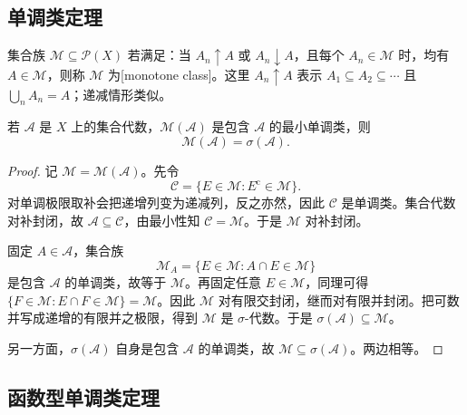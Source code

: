 \subsection{单调类定理}
\label{b1:subsec:010304}

\begin{definition}
\label{b1:def:monotone-class}
集合族 \(\mathcal M\subseteq\mathcal P(X)\) 若满足：当 \(A_n\uparrow A\) 或 \(A_n\downarrow A\)，且每个 \(A_n\in\mathcal M\) 时，均有 \(A\in\mathcal M\)，则称 \(\mathcal M\) 为[monotone class]。这里 \(A_n\uparrow A\) 表示 \(A_1\subseteq A_2\subseteq\cdots\) 且 \(\bigcup_nA_n=A\)；递减情形类似。
\end{definition}

\begin{theorem}
\label{b1:thm:monotone-class}
若 \(\mathcal A\) 是 \(X\) 上的集合代数，\(\mathcal M(\mathcal A)\) 是包含 \(\mathcal A\) 的最小单调类，则
\[
\mathcal M(\mathcal A)=\sigma(\mathcal A).
\]
\end{theorem}
\begin{proof}
记 \(\mathcal M=\mathcal M(\mathcal A)\)。先令
\[
\mathcal C=\{E\in\mathcal M:E^{\mathrm c}\in\mathcal M\}.
\]
对单调极限取补会把递增列变为递减列，反之亦然，因此 \(\mathcal C\) 是单调类。集合代数对补封闭，故 \(\mathcal A\subseteq\mathcal C\)，由最小性知 \(\mathcal C=\mathcal M\)。于是 \(\mathcal M\) 对补封闭。

固定 \(A\in\mathcal A\)，集合族
\[
\mathcal M_A=\{E\in\mathcal M:A\cap E\in\mathcal M\}
\]
是包含 \(\mathcal A\) 的单调类，故等于 \(\mathcal M\)。再固定任意 \(E\in\mathcal M\)，同理可得 \(\{F\in\mathcal M:E\cap F\in\mathcal M\}=\mathcal M\)。因此 \(\mathcal M\) 对有限交封闭，继而对有限并封闭。把可数并写成递增的有限并之极限，得到 \(\mathcal M\) 是 \(\sigma\)-代数。于是 \(\sigma(\mathcal A)\subseteq\mathcal M\)。

另一方面，\(\sigma(\mathcal A)\) 自身是包含 \(\mathcal A\) 的单调类，故 \(\mathcal M\subseteq\sigma(\mathcal A)\)。两边相等。
\end{proof}

\subsection{函数型单调类定理}
\label{b1:subsec:010305}

